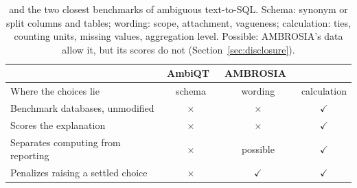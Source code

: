 \begin{table}[t]
\caption{\system{} and the two closest benchmarks of ambiguous text-to-SQL. Schema: synonym or split columns and tables; wording: scope, attachment, vagueness; calculation: ties, counting units, missing values, aggregation level. Possible: AMBROSIA's data allow it, but its scores do not (Section~\ref{sec:disclosure}).}
\label{tab:comparison}
\centering\footnotesize
\providecommand{\cm}{\ensuremath{\checkmark}}\providecommand{\xm}{\ensuremath{\times}}
\setlength{\tabcolsep}{3.5pt}
\begin{tabular}{@{}lccc@{}}
\toprule
& AmbiQT~\cite{ambiqt2023} & AMBROSIA~\cite{ambrosia2024} & \system{}\\
\midrule
Where the choices lie & schema & wording & calculation\\
\midrule
Benchmark databases, unmodified & \xm & \xm & \cm\\
Scores the explanation & \xm & \xm & \cm\\
Separates computing from reporting & \xm & possible & \cm\\
Penalizes raising a settled choice & \xm & \cm & \cm\\
\bottomrule
\end{tabular}
\end{table}
